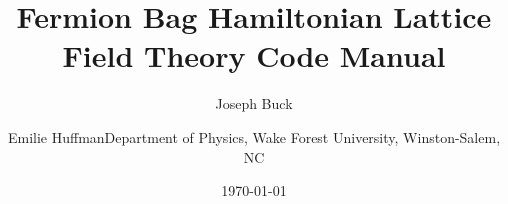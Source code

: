 \documentclass[11pt,a4paper]{article}
\begin{document}
\title{\textbf{Fermion Bag Hamiltonian Lattice Field Theory Code Manual}}
\author{
  Joseph Buck \and Emilie Huffman\small Department of Physics, Wake Forest 
  University, Winston-Salem, NC
}
\date{\today}
\maketitle

\tableofcontents
\newpage















\end{document}
